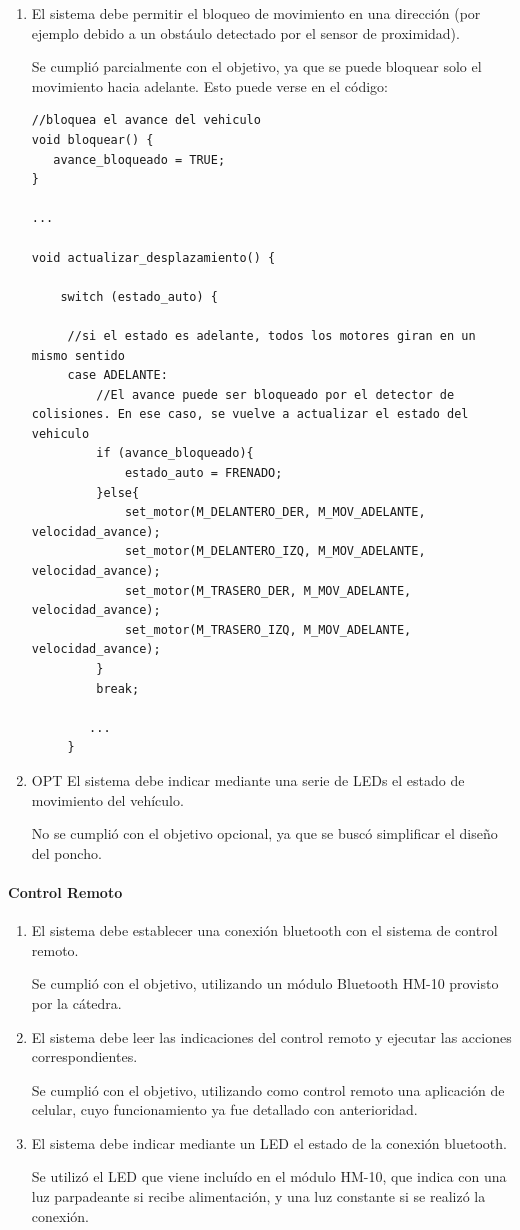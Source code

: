 \begin{enumerate}
\def\labelenumi{\arabic{enumi}.}
\setcounter{enumi}{2}
\item
  El sistema debe permitir el bloqueo de movimiento en una dirección
  (por ejemplo debido a un obstáulo detectado por el sensor de
  proximidad).

  Se cumplió parcialmente con el objetivo, ya que se puede bloquear solo
  el movimiento hacia adelante. Esto puede verse en el código:

\begin{lstlisting}
//bloquea el avance del vehiculo
void bloquear() {
   avance_bloqueado = TRUE;
}

...

void actualizar_desplazamiento() {

    switch (estado_auto) {

     //si el estado es adelante, todos los motores giran en un mismo sentido
     case ADELANTE:
         //El avance puede ser bloqueado por el detector de colisiones. En ese caso, se vuelve a actualizar el estado del vehiculo
         if (avance_bloqueado){
             estado_auto = FRENADO;
         }else{
             set_motor(M_DELANTERO_DER, M_MOV_ADELANTE, velocidad_avance);
             set_motor(M_DELANTERO_IZQ, M_MOV_ADELANTE, velocidad_avance);
             set_motor(M_TRASERO_DER, M_MOV_ADELANTE, velocidad_avance);
             set_motor(M_TRASERO_IZQ, M_MOV_ADELANTE, velocidad_avance);
         }
         break;

        ...
     }
\end{lstlisting}
\item
  OPT El sistema debe indicar mediante una serie de LEDs el estado de
  movimiento del vehículo.

No se cumplió con el objetivo opcional, ya que se buscó simplificar el
diseño del poncho.
\end{enumerate}

\paragraph{Control Remoto}

\begin{enumerate}
\def\labelenumi{\arabic{enumi}.}
\item
  El sistema debe establecer una conexión bluetooth con el sistema de
  control remoto.

  Se cumplió con el objetivo, utilizando un módulo Bluetooth HM-10
  provisto por la cátedra.
\item
  El sistema debe leer las indicaciones del control remoto y ejecutar
  las acciones correspondientes.

  Se cumplió con el objetivo, utilizando como control remoto una
  aplicación de celular, cuyo funcionamiento ya fue detallado con
  anterioridad.
\item
  El sistema debe indicar mediante un LED el estado de la conexión
  bluetooth.

  Se utilizó el LED que viene incluído en el módulo HM-10, que indica
  con una luz parpadeante si recibe alimentación, y una luz constante si
  se realizó la conexión.
\end{enumerate}

